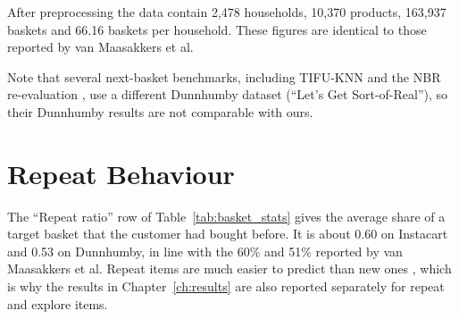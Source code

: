After preprocessing the data contain 2,478 households, 10,370 products, 163,937
baskets and 66.16 baskets per household. These figures are identical to those
reported by van Maasakkers et al.

Note that several next-basket benchmarks, including TIFU-KNN \cite{hu2020} and
the NBR re-evaluation \cite{li2023}, use a different Dunnhumby dataset (``Let's
Get Sort-of-Real''), so their Dunnhumby results are not comparable with ours.


\section{Repeat Behaviour}

The ``Repeat ratio'' row of Table~\ref{tab:basket_stats} gives the average share
of a target basket that the customer had bought before. It is about 0.60 on
Instacart and 0.53 on Dunnhumby, in line with the 60\% and 51\% reported by van
Maasakkers et al. Repeat items are much easier to predict than new ones
\cite{li2023}, which is why the results in Chapter~\ref{ch:results} are also
reported separately for repeat and explore items.
